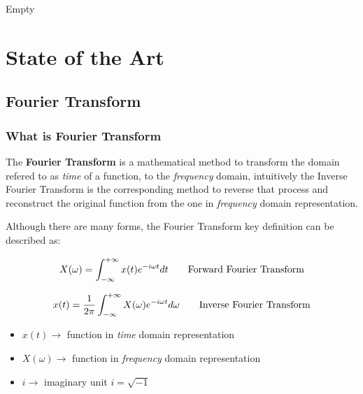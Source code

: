 \documentclass[
  oneside,
  11pt, a4paper,
  footinclude=true,
  headinclude=true,
  cleardoublepage=empty
]{scrbook}
\newcommand{\eqname}[1]{\tag*{#1}}%
\begin{document}
Empty


\chapter{State of the Art}

\section{Fourier Transform}


\subsection{What is Fourier Transform}

The \textbf{Fourier Transform} is a mathematical method to transform the domain refered to as \textit{time} of a function, to the \textit{frequency} domain, intuitively the Inverse Fourier Transform is the corresponding method to reverse that process and reconstruct the original function from the one in \textit{frequency} domain representation.

Although there are many forms, the Fourier Transform key definition can be described as:

\begin{equation} \label{eq1}
    X(\omega) = \int_{-\infty}^{+\infty} x(t)e^{-i \omega t} dt \\ \eqname{Forward Fourier Transform} \\
\end{equation}

\begin{equation} \label{eq2}
        x(t) = \frac{1}{2\pi} \int_{-\infty}^{+\infty} X(\omega)e^{-i \omega t} d\omega \\ \eqname{Inverse Fourier Transform} \\
\end{equation}

\begin{itemize}
    \item \( x(t) \rightarrow \) function in \textit{time} domain representation
    \item \( X(\omega) \rightarrow \) function in \textit{frequency} domain representation
    \item \( i \rightarrow \) imaginary unit \( i = \sqrt{-1} \)
\end{itemize}
\end{document}
